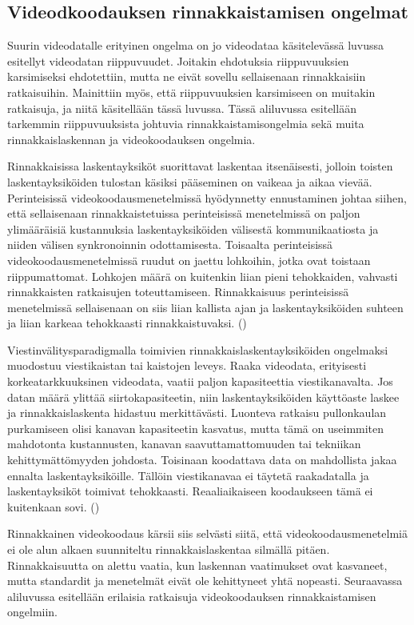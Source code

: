 \subsection{Videodkoodauksen rinnakkaistamisen ongelmat}

Suurin videodatalle erityinen ongelma on jo videodataa käsitelevässä luvussa
esitellyt videodatan riippuvuudet. Joitakin ehdotuksia riippuvuuksien
karsimiseksi ehdotettiin, mutta ne eivät sovellu sellaisenaan rinnakkaisiin
ratkaisuihin. Mainittiin myös, että riippuvuuksien karsimiseen on muitakin
ratkaisuja, ja niitä käsitellään tässä luvussa. Tässä aliluvussa esitellään
tarkemmin riippuvuuksista johtuvia rinnakkaistamisongelmia sekä muita
rinnakkaislaskennan ja videokoodauksen ongelmia.

Rinnakkaisissa laskentayksiköt suorittavat laskentaa itsenäisesti, jolloin
toisten laskentayksiköiden tulostan käsiksi pääseminen on vaikeaa ja
aikaa vievää. Perinteisissä videokoodausmenetelmissä hyödynnetty ennustaminen
johtaa siihen, että sellaisenaan rinnakkaistetuissa perinteisissä menetelmissä
on paljon ylimääräisiä kustannuksia laskentayksiköiden välisestä
kommunikaatiosta ja niiden välisen synkronoinnin odottamisesta. Toisaalta
perinteisissä videokoodausmenetelmissä ruudut on jaettu lohkoihin, jotka ovat
toistaan riippumattomat. Lohkojen määrä on kuitenkin liian pieni tehokkaiden,
vahvasti rinnakkaisten ratkaisujen toteuttamiseen. Rinnakkaisuus perinteisissä
menetelmissä sellaisenaan on siis liian kallista ajan ja laskentayksiköiden
suhteen ja liian karkeaa tehokkaasti rinnakkaistuvaksi. (\citealt{pieters})

Viestinvälitysparadigmalla toimivien rinnakkaislaskentayksiköiden ongelmaksi
muodostuu viestikaistan tai kaistojen leveys. Raaka videodata, erityisesti
korkeatarkkuuksinen videodata, vaatii paljon kapasiteettia viestikanavalta. Jos
datan määrä ylittää siirtokapasiteetin, niin laskentayksiköiden käyttöaste
laskee ja rinnakkaislaskenta hidastuu merkittävästi. Luonteva ratkaisu
pullonkaulan purkamiseen olisi kanavan kapasiteetin kasvatus, mutta tämä on
useimmiten mahdotonta kustannusten, kanavan saavuttamattomuuden tai tekniikan
kehittymättömyyden johdosta. Toisinaan koodattava data on mahdollista jakaa
ennalta laskentayksiköille. Tällöin viestikanavaa ei täytetä raakadatalla ja
laskentayksiköt toimivat tehokkaasti. Reaaliaikaiseen koodaukseen tämä ei
kuitenkaan sovi. (\citealt{li})

Rinnakkainen videokoodaus kärsii siis selvästi siitä, että
videokoodausmenetelmiä ei ole alun alkaen suunniteltu rinnakkaislaskentaa
silmällä pitäen. Rinnakkaisuutta on alettu vaatia, kun laskennan vaatimukset
ovat kasvaneet, mutta standardit ja menetelmät eivät ole kehittyneet
yhtä nopeasti. Seuraavassa aliluvussa esitellään erilaisia ratkaisuja
videokoodauksen rinnakkaistamisen ongelmiin.

